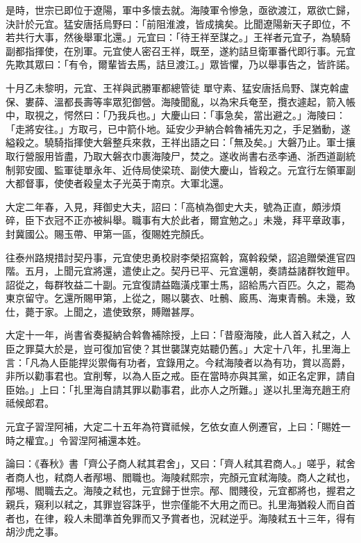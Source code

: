\begin{pinyinscope}
 是時，世宗已即位于遼陽，軍中多懷去就。海陵軍令慘急，亟欲渡江，眾欲亡歸，決計於元宜。猛安唐括烏野曰：「前阻淮渡，皆成擒矣。比聞遼陽新天子即位，不若共行大事，然後舉軍北還。」元宜曰：「待王祥至謀之。」王祥者元宜子，為驍騎副都指揮使，在別軍。元宜使人密召王祥，既至，遂約詰旦衛軍番代即行事。元宜先欺其眾曰：「有令，爾輩皆去馬，詰旦渡江。」眾皆懼，乃以舉事告之，皆許諾。



 十月乙未黎明，元宜、王祥與武勝軍都總管徒
 單守素、猛安唐括烏野、謀克斡盧保、婁薛、溫都長壽等率眾犯御營。海陵聞亂，以為宋兵奄至，攬衣遽起，箭入帳中，取視之，愕然曰：「乃我兵也。」大慶山曰：「事急矣，當出避之。」海陵曰：「走將安往。」方取弓，已中箭仆地。延安少尹納合斡魯補先刃之，手足猶動，遂縊殺之。驍騎指揮使大磐整兵來救，王祥出語之曰：「無及矣。」大磐乃止。軍士攘取行營服用皆盡，乃取大磐衣巾裹海陵尸，焚之。遂收尚書右丞李通、浙西道副統制郭安國、監軍徒單永年、近侍局使梁珫、副使大慶山，皆殺之。元宜行左領軍副大都督事，使使者殺皇太子光英于南京。大軍北還。



 大定二年春，入見，拜御史大夫，詔曰：「高楨為御史大夫，號為正直，頗涉煩碎，臣下衣冠不正亦被糾舉。職事有大於此者，爾宜勉之。」未幾，拜平章政事，封冀國公。賜玉帶、甲第一區，復賜姓完顏氏。



 往泰州路規措討契丹事，元宜使忠勇校尉李榮招窩斡，窩斡殺榮，詔追贈榮進官四階。五月，上聞元宜將還，遣使止之。契丹已平、元宜還朝，奏請益諸群牧鎧甲。詔從之，每群牧益二十副。元宜復請益臨潢戍軍士馬，詔給馬六百匹。久之，罷為東京留守。乞還所賜甲第，上從之，賜以襲衣、吐鶻、廄馬、海東青鶻。未幾，致仕，薨于家。上聞之，遣使致祭，賻贈甚厚。



 大定十一年，尚書省奏擬納合斡魯補除授，上曰：「昔廢海陵，此人首入弒之，人臣之罪莫大於是，豈可復加官使？其世襲謀克姑聽仍舊。」大定十八年，扎里海上言：「凡為人臣能捍災禦侮有功者，宜錄用之。今弒海陵者以為有功，賞以高爵，非所以勸事君也。宜削奪，以為人臣之戒。臣在當時亦與其黨，如正名定罪，請自臣始。」上曰：「扎里海自請其罪以勸事君，此亦人之所難。」遂以扎里海充趙王府祗候郎君。



 元宜子習涅阿補，大定二十五年為符寶祗候，乞依女直人例遷官，上曰：「賜姓一時之權宜。」令習涅阿補還本姓。



 論曰：《春秋》書「齊公子商人弒其君舍」，又曰：「齊人弒其君商人。」嗟乎，弒舍者商人也，弒商人者邴埸、閻職也。海陵弒熙宗，完顏元宜弒海陵。商人之弒也，邴埸、閻職去之。海陵之弒也，元宜歸于世宗。邴、閻賤役，元宜都將也，握君之親兵，窺利以弒之，其罪豈容誅乎，世宗僅能不大用之而已。扎里海猶殺人而自首者也，在律，殺人未聞準首免罪而又予賞者也，況弒逆乎。海陵弒五十三年，得有胡沙虎之事。




\end{pinyinscope}
